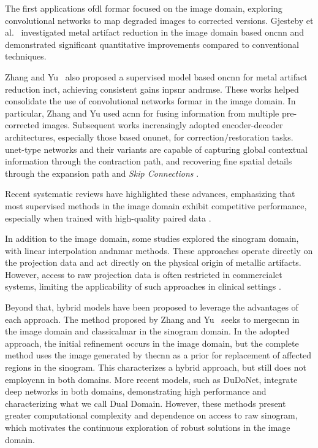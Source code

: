 The first applications of\acrfull{dl} for\acrshort{mar} focused on the image domain, exploring convolutional networks to map degraded images to corrected versions. Gjesteby et al.~\cite{gjestebyDeepLearningMethods2017} investigated metal artifact reduction in the image domain based on\acrshort{cnn} and demonstrated significant quantitative improvements compared to conventional techniques.


Zhang and Yu~\cite{zhangConvolutionalNeuralNetwork2018} also proposed a supervised model based on\acrshort{cnn} for metal artifact reduction in\acrshort{ct}, achieving consistent gains in\acrshort{psnr} and\acrfull{rmse}. These works helped consolidate the use of convolutional networks for\acrshort{mar} in the image domain. In particular, Zhang and Yu used a\acrshort{cnn} for fusing information from multiple pre-corrected images. Subsequent works increasingly adopted encoder-decoder architectures, especially those based on\acrfull{unet}, for correction/restoration tasks. \acrshort{unet}-type networks and their variants are capable of capturing global contextual information through the contraction path, and recovering fine spatial details through the expansion path and \textit{Skip Connections} \cite{ronnebergerUNetConvolutionalNetworks2015}.

Recent systematic reviews have highlighted these advances, emphasizing that most supervised methods in the image domain exhibit competitive performance, especially when trained with high-quality paired data \cite{kleberAdvancementsSupervisedDeep2024,sahuTransformingCTImaging2025}.

In addition to the image domain, some studies explored the sinogram domain, with linear interpolation and\acrfull{nmar} methods. These approaches operate directly on the projection data and act directly on the physical origin of metallic artifacts\cite{meyerNormalizedMetalArtifact2009}. However, access to raw projection data is often restricted in commercial\acrshort{ct} systems, limiting the applicability of such approaches in clinical settings \cite{gjestebyDeepLearningMethods2017}.

Beyond that, hybrid models have been proposed to leverage the advantages of each approach. The method proposed by Zhang and Yu~\cite{zhangConvolutionalNeuralNetwork2018} seeks to merge\acrshort{cnn} in the image domain and classical\acrshort{mar} in the sinogram domain. In the adopted approach, the initial refinement occurs in the image domain, but the complete method uses the image generated by the\acrshort{cnn} as a prior for replacement of affected regions in the sinogram. This characterizes a hybrid approach, but still does not employ\acrshort{cnn} in both domains. More recent models, such as DuDoNet\cite{linDuDoNetDualDomain2019}, integrate deep networks in both domains, demonstrating high performance and characterizing what we call Dual Domain. However, these methods present greater computational complexity and dependence on access to raw sinogram, which motivates the continuous exploration of robust solutions in the image domain.

